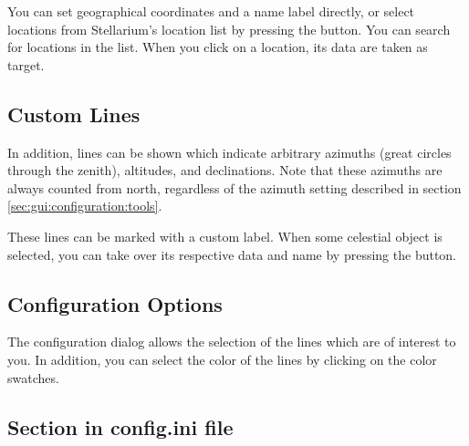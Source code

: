You can set  geographical coordinates and a name
label directly, or select locations from Stellarium's location list by
pressing the  button.  You can search for locations in the
list. When you click on a location, its data are taken as target.

\subsection{Custom Lines}
\label{sec:plugin:ArchaeoLines:Custom}

In addition, lines can be shown which indicate arbitrary azimuths (great circles through the zenith),
altitudes, and declinations.   Note that these azimuths are always counted
from north, regardless of the azimuth setting described in section
\ref{sec:gui:configuration:tools}.

These lines can be marked with a custom label. When some celestial
object is selected, you can take over its respective data and name by
pressing the  button.

\subsection{Configuration Options}
\label{sec:plugin:ArchaeoLines:configuration}

The configuration dialog allows the selection of the lines which are
of interest to you. 
%
%
In addition, you can select the color of the lines by clicking on the
color swatches.

\subsection*{Section  in config.ini file}


